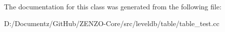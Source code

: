 The documentation for this class was generated from the following file\+:\begin{DoxyCompactItemize}
\item 
D\+:/\+Documentz/\+Git\+Hub/\+Z\+E\+N\+Z\+O-\/\+Core/src/leveldb/table/table\+\_\+test.\+cc\end{DoxyCompactItemize}
